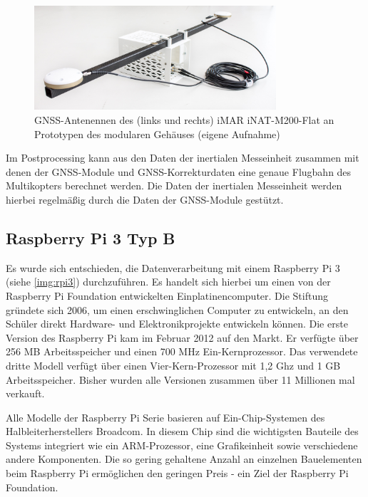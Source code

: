\documentclass[a4paper,12pt,bibliography=totoc, listof=totoc,titlepage,pointlessnumbers]{scrreprt}
\begin{document}
\begin{figure}
 \centering
 \includegraphics[width=0.8\textwidth]{./img/gnss.jpg}
 \caption{GNSS-Antenennen des (links und rechts) iMAR iNAT-M200-Flat an Prototypen des modularen Gehäuses (eigene Aufnahme)}
 \label{img:gnss}
\end{figure}

Im Postprocessing kann aus den Daten der inertialen Messeinheit zusammen mit denen der GNSS-Module und GNSS-Korrekturdaten eine genaue Flugbahn des Multikopters berechnet werden. Die Daten der inertialen Messeinheit werden hierbei regelmäßig durch die Daten der GNSS-Module gestützt.

\subsection{Raspberry Pi 3 Typ B}
\label{ss:Raspberry}
Es wurde sich entschieden, die Datenverarbeitung mit einem Raspberry Pi 3 (siehe \autoref{img:rpi3}) durchzuführen. Es handelt sich hierbei um einen von der Raspberry Pi Foundation entwickelten Einplatinencomputer. Die Stiftung gründete sich 2006, um einen erschwinglichen Computer zu entwickeln, an den Schüler direkt Hardware- und Elektronikprojekte entwickeln können. Die erste Version des Raspberry Pi kam im Februar 2012 auf den Markt. Er verfügte über 256 MB Arbeitsspeicher und einen 700 MHz Ein-Kernprozessor. Das verwendete dritte Modell verfügt über einen Vier-Kern-Prozessor mit 1,2 Ghz und 1 GB Arbeitsspeicher. Bisher wurden alle Versionen zusammen über 11 Millionen mal verkauft. \citep{heise5Rasp}

Alle Modelle der Raspberry Pi Serie basieren auf Ein-Chip-Systemen des Halbleiterherstellers Broadcom. In diesem Chip sind die wichtigsten Bauteile des Systems integriert wie ein ARM-Prozessor, eine Grafikeinheit sowie verschiedene andere Komponenten. Die so gering gehaltene Anzahl an einzelnen Bauelementen beim Raspberry Pi ermöglichen den geringen Preis - ein Ziel der Raspberry Pi Foundation.
\end{document}
